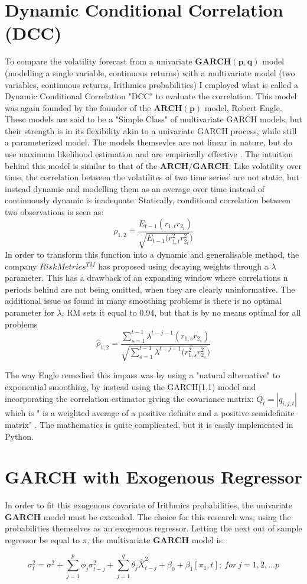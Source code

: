 \section{Dynamic Conditional Correlation (DCC)}
To compare the volatility forecast from a univariate $\mathbf{GARCH(p,q)}$ model (modelling a single variable, continuous returns) with a multivariate model (two variables, continuous returns, Irithmics probabilities) I employed what is called a Dynamic Conditional Correlation "DCC" to evaluate the correlation. This model was again founded by the founder of the $\mathbf{ARCH(p)}$ model, Robert Engle. These models are said to be a "Simple Class" of multivariate GARCH models, but their strength is in its flexibility akin to a univariate GARCH process, while still a parameterized model. The models themsevles are not linear in nature, but do use maximum likelihood estimation and are empirically effective \cite{DCC}.   
The intuition behind this model is similar to that of the $\mathbf{ARCH/GARCH}$: Like volatility over time, the correlation between the volatilites of two time series' are not static, but instead dynamic and modelling them as an average over time instead of continuously dynamic is inadequate. Statically, conditional correlation between two observations is seen as:
$$ 
\rho_{1,2} = \frac{E_{t-1}(r_{1,t}r_{2_t})}{\sqrt{E_{t-1}(r_{1,t}^2r_{2_t}^2})}
$$
In order to transform this function into a dynamic and generalisable method, the company $RiskMetrics^{TM}$ has proposed using decaying weights through a $\lambda$ parameter. This has a drawback of an expanding window where correlations n periods behind are not being omitted, when they are clearly uninformative. The additional issue as found in many smoothing problems is there is no optimal parameter for $\lambda$, RM sets it equal to 0.94, but that is by no means optimal for all problems
$$
\hat{\rho}_{1,2} = \frac{\sum^{t-1}_{s=1}\lambda^{t-j-1}(r_{1,s}r_{2_s})}
{\sqrt{\sum^{t-1}_{s=1}\lambda^{t-j-1}(r_{1,s}^2r_{2_s}^2})}
$$

The way Engle remedied this impass was by using a "natural alternative" to exponential smoothing, by instead using the GARCH(1,1) model and incorporating the correlation estimator giving the covariance matrix: $Q_t = |q_{i,j,t}|$ which is " is a weighted average of a positive definite and a positive semidefinite matrix" \cite{DCC}. The mathematics is quite complicated, but it is easily implemented in Python. 

\section{GARCH with Exogenous Regressor}
In order to fit this exogenous covariate of Irithmics probabilities, the univariate $\mathbf{GARCH}$ model must be extended. The choice for this research was, using the probabilities themselves as an exogenous regressor. Letting the next out of sample regressor be equal to $\pi$, the multivariate $\mathbf{GARCH}$ model is:

$$
\sigma_t^2 = \sigma^2 + \sum^p_{j=1} \phi_j\sigma^2_{t-j}+ \sum^q_{j=1} \theta_j\hat{X}^2_{t-j} + \beta_0 + \beta_1[\pi_1,t] ; ~ for~j = 1,2,...p
$$